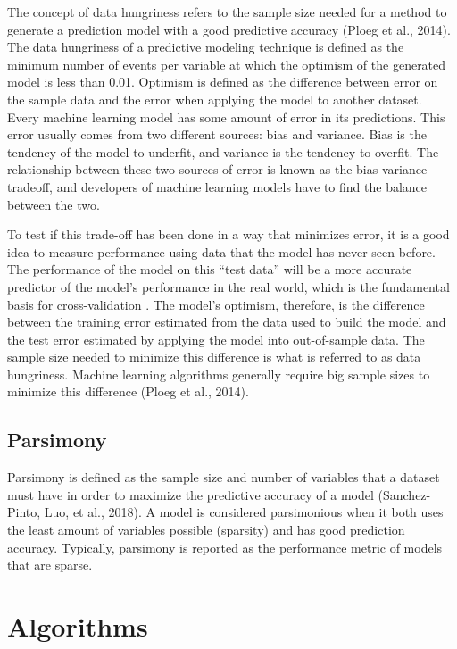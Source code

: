 \documentclass[
  man]{apa7}
\begin{document}
The concept of data hungriness refers to the sample size needed for a method to generate a prediction model with a good predictive accuracy (Ploeg et al., 2014).
The data hungriness of a predictive modeling technique is defined as the minimum number of events per variable at which the optimism of the generated model is less than 0.01.
Optimism is defined as the difference between error on the sample data and the error when applying the model to another dataset.
Every machine learning model has some amount of error in its predictions.
This error usually comes from two different sources: bias and variance.
Bias is the tendency of the model to underfit, and variance is the tendency to overfit.
The relationship between these two sources of error is known as the bias-variance tradeoff, and developers of machine learning models have to find the balance between the two.

To test if this trade-off has been done in a way that minimizes error, it is a good idea to measure performance using data that the model has never seen before.
The performance of the model on this ``test data'' will be a more accurate predictor of the model's performance in the real world, which is the fundamental basis for cross-validation .
The model's optimism, therefore, is the difference between the training error estimated from the data used to build the model and the test error estimated by applying the model into out-of-sample data.
The sample size needed to minimize this difference is what is referred to as data hungriness.
Machine learning algorithms generally require big sample sizes to minimize this difference (Ploeg et al., 2014).

\subsection{Parsimony}\label{parsimony}

Parsimony is defined as the sample size and number of variables that a dataset must have in order to maximize the predictive accuracy of a model (Sanchez-Pinto, Luo, et al., 2018).
A model is considered parsimonious when it both uses the least amount of variables possible (sparsity) and has good prediction accuracy.
Typically, parsimony is reported as the performance metric of models that are sparse.

\section{Algorithms}\label{algorithms}
\end{document}
